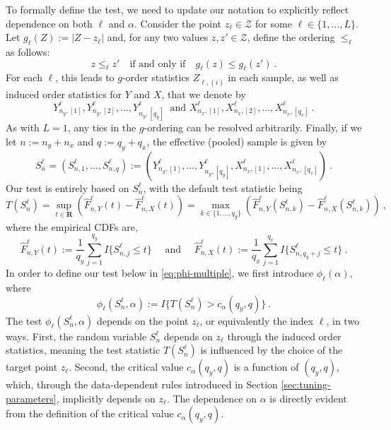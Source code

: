 \documentclass[11pt]{article}
\numberwithin{equation}{section}
\begin{document}
To formally define the test, we need to update our notation to explicitly reflect dependence on both $\ell$ and $\alpha$. Consider the point $z_{\ell}\in \mathcal Z$ for some $\ell\in \{1,\dots,L\}$. Let $g_{\ell}(Z) := |Z - z_{\ell}|$ and, for any two values \( z, z' \in \mathcal{Z} \), define the ordering \(\le_{\ell}\) as follows:
\[
z \le_{\ell} z' \quad \text{if and only if} \quad g_{\ell}(z) \le g_{\ell}(z')~.
\]
For each $\ell$, this leads to $g$-order statistics \( Z_{\ell,(i)} \) in each sample, as well as induced order statistics for $Y$ and $X$, that we denote by 
\begin{equation*}
  Y^{\ell}_{n_y,[1]},Y^{\ell}_{n_y,[2]}, \dots,Y^{\ell}_{n_y,[q_y]}~\text{ and } X^{\ell}_{n_x,[1]},X^{\ell}_{n_x,[2]}, \dots,X^{\ell}_{n_x,[q_x]}~.
\end{equation*}
As with $L=1$, any ties in the $g$-ordering can be resolved arbitrarily. Finally, if we let \(n := n_y + n_x\) and \(q := q_y + q_x\), the effective (pooled) sample is given by
\begin{equation}\label{eq:Sn_ell}
  S^{\ell}_n = (S^{\ell}_{n,1}, \dots, S^{\ell}_{n,q}) := (Y^{\ell}_{n_y,[1]}, \dots, Y^{\ell}_{n_y,[q_y]}, X^{\ell}_{n_x,[1]}, \dots, X^{\ell}_{n_x,[q_x]})~.
\end{equation}
Our test is entirely based on \(S^{\ell}_n\), with the default test statistic being 
\begin{equation*}\label{eq:ks-stat-ell}
  T(S^{\ell}_n) = \sup_{t\in \mathbf R} \left( \hat F^{\ell}_{n,Y}(t) - \hat F^{\ell}_{n,X}(t) \right) = \max_{k \in \{1,\dots,q_y\}} \left( \hat F^{\ell}_{n,Y}(S^{\ell}_{n,k}) - \hat F^{\ell}_{n,X}(S^{\ell}_{n,k}) \right) ~,
\end{equation*}
where the empirical CDFs are, 
\begin{equation*}
  \hat F^{\ell}_{n,Y}(t) := \frac{1}{q_y} \sum_{j=1}^{q_y} I\{S^{\ell}_{n,j} \le t\} \quad \text{ and }\quad \hat F^{\ell}_{n,X}(t) := \frac{1}{q_x} \sum_{j=1}^{q_x} I\{S^{\ell}_{n,q_y+j} \le t\}~.
\end{equation*}
In order to define our test below in \eqref{eq:phi-multiple}, we first introduce $\phi_{\ell}(\alpha)$, where 
\begin{equation*}\label{eq:our-test-ell}
  \phi_{\ell}(S^{\ell}_n,\alpha) := I\{T(S^{\ell}_n)>c_{\alpha}(q_y,q)\}~.
\end{equation*}
The test \( \phi_{\ell}(S^{\ell}_n,\alpha) \) depends on the point \( z_{\ell} \), or equivalently the index \( \ell \), in two ways. First, the random variable \( S^{\ell}_n \) depends on \( z_{\ell} \) through the induced order statistics, meaning the test statistic \( T(S^{\ell}_n) \) is influenced by the choice of the target point \( z_{\ell} \). Second, the critical value \( c_{\alpha}(q_y, q) \) is a function of \( (q_y, q) \), which, through the data-dependent rules introduced in Section \ref{sec:tuning-parameters}, implicitly depends on \( z_{\ell} \). The dependence on \( \alpha \) is directly evident from the definition of the critical value \( c_{\alpha}(q_y, q) \).
\end{document}
